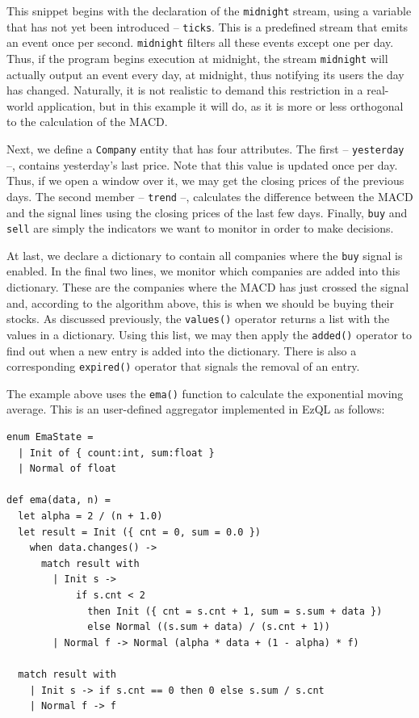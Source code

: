 This snippet begins with the declaration of the \verb=midnight=
stream, using a variable that has not yet been introduced --
\verb=ticks=. This is a predefined stream that emits an event once per
second. \verb=midnight= filters all these events except one per
day. Thus, if the program begins execution at midnight, the stream
\verb=midnight= will actually output an event every day, at midnight,
thus notifying its users the day has changed. Naturally, it is not
realistic to demand this restriction in a real-world application, but
in this example it will do, as it is more or less orthogonal to the
calculation of the MACD.

Next, we define a \verb=Company= entity that has four attributes. The
first -- \verb=yesterday= --, contains yesterday's last price. Note
that this value is updated once per day. Thus, if we open a window
over it, we may get the closing prices of the previous days. The
second member -- \verb=trend= --, calculates the difference between
the MACD and the signal lines using the closing prices of the last few
days. Finally, \verb=buy= and \verb=sell= are simply the indicators we
want to monitor in order to make decisions.

At last, we declare a dictionary to contain all companies where the
\verb=buy= signal is enabled. In the final two lines, we monitor which
companies are added into this dictionary. These are the companies
where the MACD has just crossed the signal and, according to the
algorithm above, this is when we should be buying their stocks. As
discussed previously, the \verb=values()= operator returns a list with
the values in a dictionary. Using this list, we may then apply the
\verb=added()= operator to find out when a new entry is added into the
dictionary. There is also a corresponding \verb=expired()= operator that
signals the removal of an entry.

The example above uses the \verb=ema()= function to calculate the
exponential moving average. This is an user-defined aggregator
implemented in EzQL as follows:

\begin{lstlisting}
enum EmaState =
  | Init of { count:int, sum:float }
  | Normal of float

def ema(data, n) =
  let alpha = 2 / (n + 1.0)
  let result = Init ({ cnt = 0, sum = 0.0 })
    when data.changes() ->
      match result with
        | Init s ->
            if s.cnt < 2
              then Init ({ cnt = s.cnt + 1, sum = s.sum + data })
              else Normal ((s.sum + data) / (s.cnt + 1))
        | Normal f -> Normal (alpha * data + (1 - alpha) * f)

  match result with
    | Init s -> if s.cnt == 0 then 0 else s.sum / s.cnt
    | Normal f -> f
\end{lstlisting}

